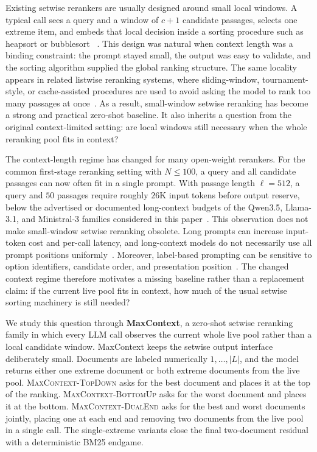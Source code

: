 Existing setwise rerankers are usually designed around small local
windows. A typical call sees a query and a window of $c{+}1$ candidate
passages, selects one extreme item, and embeds that local decision inside
a sorting procedure such as heapsort or bubblesort
~\citep{qin2024prp,zhuang2024setwise}. This design was natural when
context length was a binding constraint: the prompt stayed small, the
output was easy to validate, and the sorting algorithm supplied the
global ranking structure. The same locality appears in related listwise
reranking systems, where sliding-window, tournament-style, or
cache-assisted procedures are used to avoid asking the model to rank too
many passages at once~\citep{sun2023rankgpt,ma2023zeroshotlistwise,
yoon2024listt5}. As a result, small-window setwise reranking has become a
strong and practical zero-shot baseline. It also inherits a question from
the original context-limited setting: are local windows still necessary
when the whole reranking pool fits in context?

The context-length regime has changed for many open-weight rerankers.
For the common first-stage reranking setting with $N \le 100$, a query
and all candidate passages can now often fit in a single prompt. With
passage length $\ell=512$, a query and $50$ passages require roughly
$26$K input tokens before output reserve, below the advertised or
documented long-context budgets of the Qwen3.5, Llama-3.1, and
Ministral-3 families considered in this paper~\citep{qwen2026qwen35,
dubey2024llama3,liu2026ministral3}. This observation does not make
small-window setwise reranking obsolete. Long prompts can increase
input-token cost and per-call latency, and long-context models do not
necessarily use all prompt positions uniformly~\citep{liu2024lost}.
Moreover, label-based prompting can be sensitive to option identifiers,
candidate order, and presentation position~\citep{zheng2024mcqbias,
shi2025positionbias,pradeep2023rankzephyr}. The changed context regime
therefore motivates a missing baseline rather than a replacement claim:
if the current live pool fits in context, how much of the usual setwise
sorting machinery is still needed?

We study this question through \textbf{MaxContext}, a zero-shot setwise
reranking family in which every LLM call observes the current whole live
pool rather than a local candidate window. MaxContext keeps the setwise
output interface deliberately small. Documents are labeled numerically
$1,\ldots,|L|$, and the model returns either one extreme document or both
extreme documents from the live pool. \textsc{MaxContext-TopDown} asks
for the best document and places it at the top of the ranking.
\textsc{MaxContext-BottomUp} asks for the worst document and places it at
the bottom. \textsc{MaxContext-DualEnd} asks for the best and worst
documents jointly, placing one at each end and removing two documents
from the live pool in a single call. The single-extreme variants close
the final two-document residual with a deterministic BM25 endgame.

